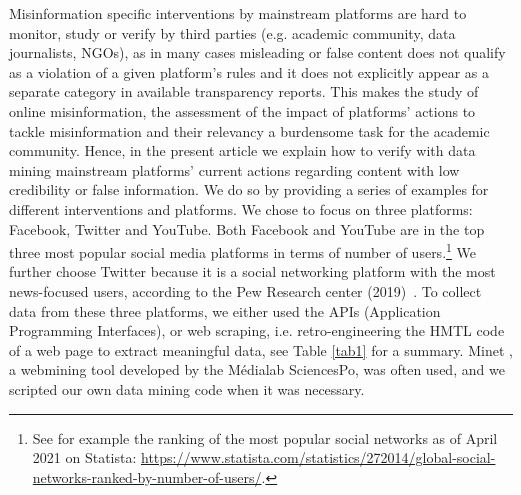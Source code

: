 \documentclass{article}
\begin{document}
Misinformation specific interventions by mainstream platforms are hard to monitor, study or verify by third parties (e.g. academic community, data journalists, NGOs), as in many cases misleading or false content does not qualify as a violation of a given platform's rules and it does not explicitly appear as a separate category in available transparency reports. This makes the study of online misinformation, the assessment of the impact of platforms' actions to tackle misinformation and their relevancy a burdensome task for the academic community. Hence, in the present article we explain how to verify with data mining mainstream platforms' current actions regarding content with low credibility or false information. We do so by providing a series of examples for different interventions and platforms. We chose to focus on three platforms: Facebook, Twitter and YouTube. Both Facebook and YouTube are in the top three most popular social media platforms in terms of number of users.\footnote{See for example the ranking of the most popular social networks as of April 2021 on Statista: \href{https://www.statista.com/statistics/272014/global-social-networks-ranked-by-number-of-users/}{https://www.statista.com/statistics/272014/global-social-networks-ranked-by-number-of-users/}.} We further choose Twitter because it is a social networking platform with the most news-focused users, according to the Pew Research center (2019)~\cite{pew1}. To collect data from these three platforms, we either used the APIs (Application Programming Interfaces), or web scraping, i.e. retro-engineering the HMTL code of a web page to extract meaningful data, see Table \ref{tab1} for a summary. Minet \cite{minet}, a webmining tool developed by the Médialab SciencesPo, was often used, and we scripted our own data mining code when it was necessary.
\end{document}
